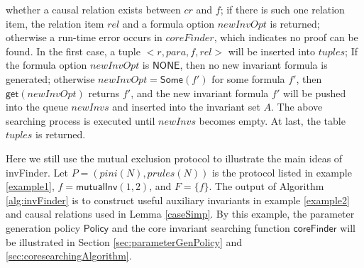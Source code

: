 \documentclass[conference]{IEEEtran}
\newcommand\lyj[1]{\textcolor{magenta}{ #1}}
\begin{document}
 whether  a causal relation exists between $cr$ and $f$; if there is such one relation item, the relation item $rel$ and a  formula option $newInvOpt$ is returned; otherwise a run-time error occurs in  $coreFinder$, which indicates no proof can be found. In the first case, a tuple $<r, para, f, rel>$ will be inserted into $tuples$; If the formula option $newInvOpt$ is $\mathsf{NONE}$, then no new invariant formula is generated; otherwise $newInvOpt=\mathsf{Some}(f')$ for some formula $f'$, then  $\mathsf{get}(newInvOpt)$ returns $f'$, and the new invariant formula $f'$ will be pushed into the queue $newInvs$ and inserted into the invariant set $A$.  The above searching process is executed until $newInvs$ becomes empty.  At last, the table $tuples$ is returned.





 Here we still use the mutual exclusion protocol to illustrate the main ideas of {\sf invFinder}. Let $ P=(pini(N),prules(N))$ is the protocol listed in example \ref{example1}, $f=\mathsf{mutualInv}(1,2)$, and $F=\{f\}$. The output of Algorithm \ref{alg:invFinder} is to construct  useful
auxiliary invariants in example \ref{example2} and causal relations used in Lemma \ref{caseSimp}. By this example,  the parameter generation policy $\mathsf{Policy}$  and the core invariant searching function $\mathsf{coreFinder}$ will be illustrated in Section \ref{sec:parameterGenPolicy} and \ref{sec:coresearchingAlgorithm}.
\end{document}
